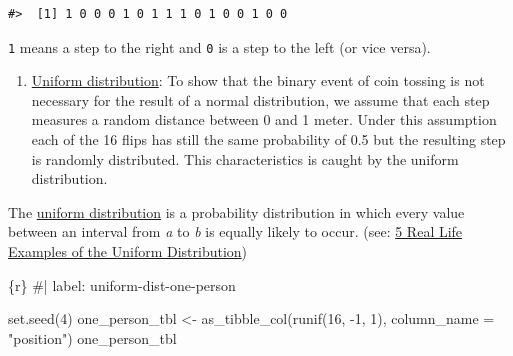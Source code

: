 \documentclass[
  letterpaper,
  DIV=11,
  numbers=noendperiod]{scrreprt}
\newenvironment{Shaded}{\begin{snugshade}}{\end{snugshade}}
\newcommand{\AttributeTok}[1]{\textcolor[rgb]{0.40,0.45,0.13}{#1}}
\newcommand{\CommentTok}[1]{\textcolor[rgb]{0.37,0.37,0.37}{#1}}
\newcommand{\DecValTok}[1]{\textcolor[rgb]{0.68,0.00,0.00}{#1}}
\newcommand{\FunctionTok}[1]{\textcolor[rgb]{0.28,0.35,0.67}{#1}}
\newcommand{\InformationTok}[1]{\textcolor[rgb]{0.37,0.37,0.37}{#1}}
\newcommand{\NormalTok}[1]{\textcolor[rgb]{0.00,0.23,0.31}{#1}}
\newcommand{\OtherTok}[1]{\textcolor[rgb]{0.00,0.23,0.31}{#1}}
\newcommand{\SpecialCharTok}[1]{\textcolor[rgb]{0.37,0.37,0.37}{#1}}
\newcommand{\StringTok}[1]{\textcolor[rgb]{0.13,0.47,0.30}{#1}}
\providecommand{\tightlist}{%
  \setlength{\itemsep}{0pt}\setlength{\parskip}{0pt}}\usepackage{longtable,booktabs,array}
\begin{document}
\begin{verbatim}
#>  [1] 1 0 0 0 1 0 1 1 1 0 1 0 0 1 0 0
\end{verbatim}

\texttt{1} means a step to the right and \texttt{0} is a step to the
left (or vice versa).

\begin{enumerate}
\def\labelenumi{\arabic{enumi}.}
\setcounter{enumi}{1}
\tightlist
\item
  \href{https://en.wikipedia.org/wiki/Continuous_uniform_distribution}{Uniform
  distribution}: To show that the binary event of coin tossing is not
  necessary for the result of a normal distribution, we assume that each
  step measures a random distance between 0 and 1 meter. Under this
  assumption each of the 16 flips has still the same probability of 0.5
  but the resulting step is randomly distributed. This characteristics
  is caught by the uniform distribution.
\end{enumerate}

\begin{tcolorbox}[enhanced jigsaw, colframe=quarto-callout-important-color-frame, colback=white, toprule=.15mm, breakable, arc=.35mm, bottomtitle=1mm, colbacktitle=quarto-callout-important-color!10!white, toptitle=1mm, titlerule=0mm, title=\textcolor{quarto-callout-important-color}{\faExclamation}\hspace{0.5em}{Uniform distribution}, leftrule=.75mm, opacityback=0, rightrule=.15mm, opacitybacktitle=0.6, bottomrule=.15mm, left=2mm, coltitle=black]

The \href{https://www.statology.org/uniform-distribution/}{uniform
distribution} is a probability distribution in which every value between
an interval from \emph{a} to \emph{b} is equally likely to occur. (see:
\href{https://www.statology.org/uniform-distribution-real-life-examples/}{5
Real Life Examples of the Uniform Distribution})

\end{tcolorbox}

\begin{Shaded}
\begin{Highlighting}[]
\InformationTok{\textasciigrave{}\textasciigrave{}\textasciigrave{}\{r\}}
\CommentTok{\#| label: uniform{-}dist{-}one{-}person}


\FunctionTok{set.seed}\NormalTok{(}\DecValTok{4}\NormalTok{)}
\NormalTok{one\_person\_tbl }\OtherTok{\textless{}{-}} \FunctionTok{as\_tibble\_col}\NormalTok{(}\FunctionTok{runif}\NormalTok{(}\DecValTok{16}\NormalTok{, }\SpecialCharTok{{-}}\DecValTok{1}\NormalTok{, }\DecValTok{1}\NormalTok{), }
                                \AttributeTok{column\_name =} \StringTok{"position"}\NormalTok{)}
\NormalTok{one\_person\_tbl}
\InformationTok{\textasciigrave{}\textasciigrave{}\textasciigrave{}}
\end{Highlighting}
\end{Shaded}
\end{document}
